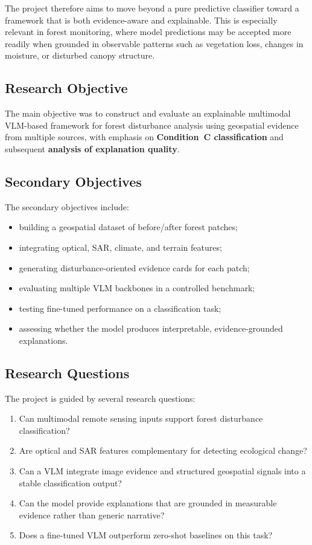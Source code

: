 \documentclass[11pt]{article}
\begin{document}
The project therefore aims to move beyond a pure predictive classifier toward a framework that is both evidence-aware and explainable. This is especially relevant in forest monitoring, where model predictions may be accepted more readily when grounded in observable patterns such as vegetation loss, changes in moisture, or disturbed canopy structure.

\subsection{Research Objective}
The main objective was to construct and evaluate an explainable multimodal VLM-based framework for forest disturbance analysis using geospatial evidence from multiple sources, with emphasis on \textbf{Condition~C classification} and subsequent \textbf{analysis of explanation quality}.

\subsection{Secondary Objectives}
The secondary objectives include:
\begin{itemize}
    \item building a geospatial dataset of before/after forest patches;
    \item integrating optical, SAR, climate, and terrain features;
    \item generating disturbance-oriented evidence cards for each patch;
    \item evaluating multiple VLM backbones in a controlled benchmark;
    \item testing fine-tuned performance on a classification task;
    \item assessing whether the model produces interpretable, evidence-grounded explanations.
\end{itemize}

\subsection{Research Questions}
The project is guided by several research questions:
\begin{enumerate}
    \item Can multimodal remote sensing inputs support forest disturbance classification?
    \item Are optical and SAR features complementary for detecting ecological change?
    \item Can a VLM integrate image evidence and structured geospatial signals into a stable classification output?
    \item Can the model provide explanations that are grounded in measurable evidence rather than generic narrative?
    \item Does a fine-tuned VLM outperform zero-shot baselines on this task?
\end{enumerate}
\end{document}
